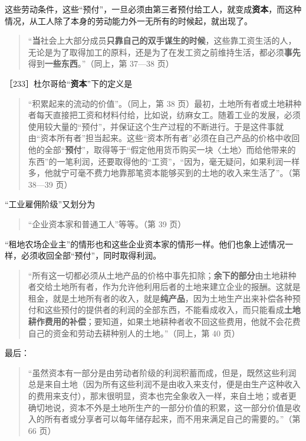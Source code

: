 这些劳动条件，这些“预付”，一旦必须由第三者预付给工人，就变成\textbf{资本}，而这种情况，从工人除了本身的劳动能力外一无所有的时候起，就出现了。

\begin{quote}“\textbf{当}社会上大部分成员\textbf{只靠自己的双手谋生的时候}，这些靠工资生活的人，无论是为了取得加工的原料，还是为了在发工资之前维持生活，都必须\textbf{事先}得到\textbf{一些东西}。”（同上，第 37—38 页）\end{quote}

［233］杜尔哥给“\textbf{资本}”下的定义是

\begin{quote}“积累起来的流动的价值”。（同上，第 38 页）最初，土地所有者或土地耕种者每天直接把工资和材料付给，比如说，纺麻女工。随着工业的发展，必须使用较大量的“预付”，并保证这个生产过程的不断进行。于是这件事就由“资本所有者”担当起来。这些“资本所有者”必须在自己产品的价格中收回他的全部“\textbf{预付}”，取得等于“假定他用货币购买一块〈土地〉而给他带来的东西”的一笔利润，还要取得他的“工资”，“因为，毫无疑问，如果利润一样多，他就宁可毫不费力地靠那笔资本能够买到的土地的收入来生活了”。（第 38—39 页）\end{quote}

“工业雇佣阶级”又划分为

\begin{quote}“企业资本家和普通工人”等等。（第 39 页）\end{quote}

“租地农场企业主”的情形也和这些企业资本家的情形一样。他们也象上述情况一样，必须收回全部“预付”，同时取得利润。

\begin{quote}“所有这一切都必须从土地产品的价格中事先扣除；\textbf{余下的部分}由土地耕种者交给土地所有者，作为允许他利用后者的土地来建立企业的报酬。这就是租金，就是土地所有者的收入，就是\textbf{纯产品}，因为土地生产出来补偿各种预付和这些预付的提供者的利润的全部东西，不能看成收入，而只能看成\textbf{土地耕作费用的补偿}；要知道，如果土地耕种者收不回这些费用，他就不会花费自己的资金和劳动去耕种别人的土地。”（同上，第 40 页）\end{quote}

最后：

\begin{quote}“虽然资本有一部分是由劳动者阶级的利润积蓄而成，但是，既然这些利润总是来自土地（因为所有这些利润不是由收入来支付，便是由生产这种收入的费用来支付），那末很明显，资本也完全象收入一样，来自土地；或者更确切地说，资本不外是土地所生产的一部分价值的积累，这一部分价值是收入的所有者或分享者可以每年储存起来，而不用来满足自己的需要的。”（第 66 页）\end{quote}

